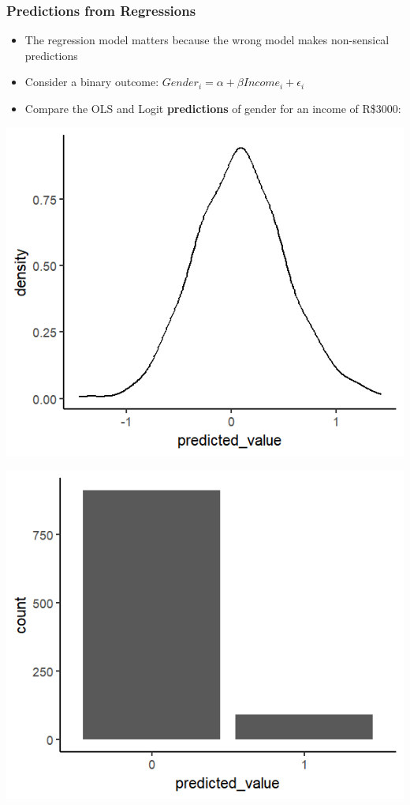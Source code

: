 \documentclass[xcolor=x11names,compress]{beamer}\usepackage[]{graphicx}\usepackage[]{color}
\makeatletter
\def\maxwidth{ %
  \ifdim\Gin@nat@width>\linewidth
    \linewidth
  \else
    \Gin@nat@width
  \fi
}
\newenvironment{knitrout}{}{} %
\renewcommand{\(}{\begin{columns}}
\renewcommand{\)}{\end{columns}}
\newcommand{\<}[1]{\begin{column}{#1}}
\renewcommand{\>}{\end{column}}
\makeatother
\begin{document}
\begin{frame}
\frametitle{Predictions from Regressions}
\begin{itemize}
\item The regression model matters because the wrong model makes non-sensical predictions
\item Consider a binary outcome: $Gender_i = \alpha + \beta Income_i + \epsilon_i$
\item Compare the OLS and Logit \textbf{predictions} of gender for an income of R\$3000:
\end{itemize}
\begin{multicols}{2}
\begin{knitrout}
\color{fgcolor}
\includegraphics[width=\maxwidth]{figure/preds_1_ols_chart-1} 

\end{knitrout}
\columnbreak
\begin{knitrout}
\color{fgcolor}
\includegraphics[width=\maxwidth]{figure/preds_1_logit_chart-1} 


\end{knitrout}
\end{multicols}
\end{frame}
\end{document}

